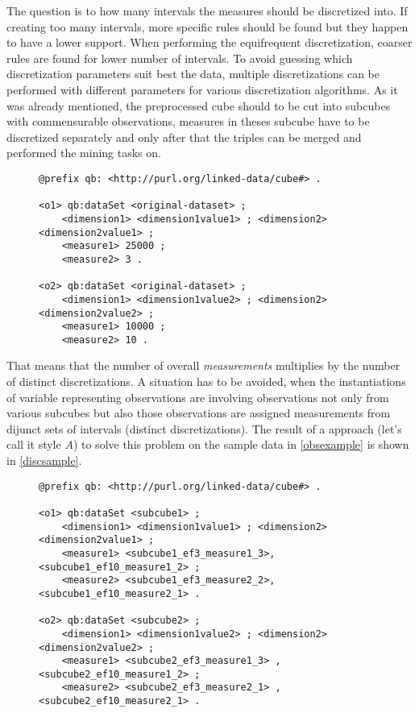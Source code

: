 The question is to how many intervals the measures should be discretized into. If creating too many intervals, more specific rules should be found but they happen to have a lower support. When performing the equifrequent discretization, coarser rules are found for lower number of intervals. To avoid guessing which discretization parameters suit best the data, multiple discretizations can be performed with different parameters for various discretization algorithms. As it was already mentioned, the preprocessed cube should to be cut into subcubes with commensurable observations, measures in theses subcube have to be discretized separately and only after that the triples can be merged and performed the mining tasks on.

\begin{figure}[h]
\begin{lstlisting}[language = turtle, caption={Observations example}, label={obsexample},captionpos=b escapeinside={(*@}{@*)}]
@prefix qb: <http://purl.org/linked-data/cube#> .

<o1> qb:dataSet <original-dataset> ;
    <dimension1> <dimension1value1> ; <dimension2> <dimension2value1> ;
    <measure1> 25000 ;
    <measure2> 3 .
    
<o2> qb:dataSet <original-dataset> ;
    <dimension1> <dimension1value2> ; <dimension2> <dimension2value2> ;
    <measure1> 10000 ;
    <measure2> 10 .
\end{lstlisting}
\end{figure}

That means that the number of overall \textit{measurements} multiplies by the number of distinct discretizations. A situation has to be avoided, when the instantiations of variable representing observations are involving observations not only from various subcubes but also those observations are assigned measurements from dijunct sets of intervals (distinct discretizations). The result of a approach (let's call it style $A$) to solve this problem on the sample data in \ref{obsexample} is shown in \ref{discsample}.

\begin{figure}[h]
\begin{lstlisting}[language = turtle, caption={Discretization style A}, label={discsample},captionpos=b escapeinside={(*@}{@*)}]
@prefix qb: <http://purl.org/linked-data/cube#> .
            
<o1> qb:dataSet <subcube1> ;
    <dimension1> <dimension1value1> ; <dimension2> <dimension2value1> ;
    <measure1> <subcube1_ef3_measure1_3>, <subcube1_ef10_measure1_2> ;
    <measure2> <subcube1_ef3_measure2_2>, <subcube1_ef10_measure2_1> .
   
<o2> qb:dataSet <subcube2> ;
    <dimension1> <dimension1value2> ; <dimension2> <dimension2value2> ;
    <measure1> <subcube2_ef3_measure1_3> , <subcube2_ef10_measure1_2> ;
    <measure2> <subcube2_ef3_measure2_1> ,<subcube2_ef10_measure2_1> .
\end{lstlisting}
\end{figure}

